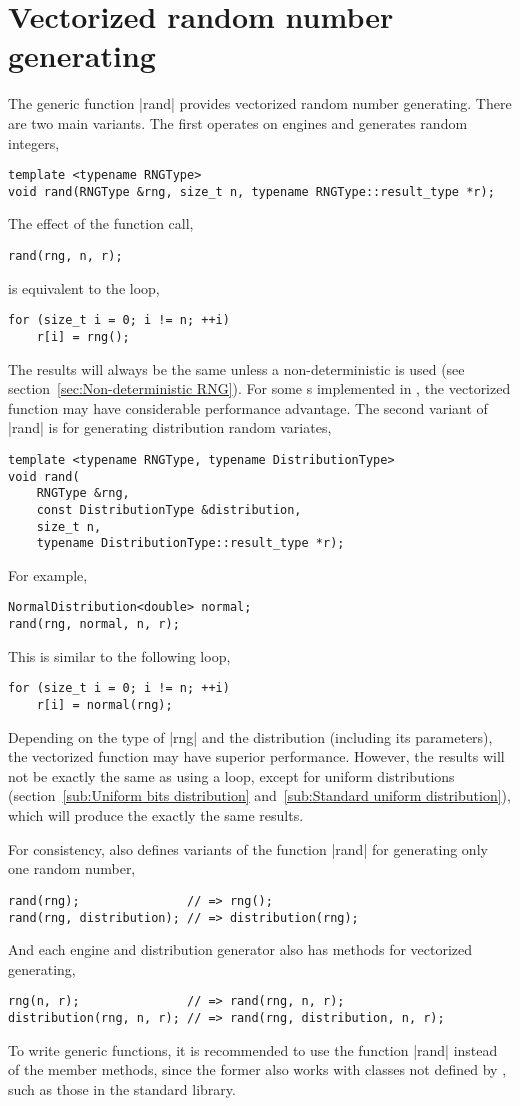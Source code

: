 \section{Vectorized random number generating}
\label{sec:Vectorized random number generating}

The generic function |rand| provides vectorized random number generating. There
are two main variants. The first operates on \rng engines and generates random
integers,
\begin{Verbatim}
template <typename RNGType>
void rand(RNGType &rng, size_t n, typename RNGType::result_type *r);
\end{Verbatim}
The effect of the function call,
\begin{Verbatim}
rand(rng, n, r);
\end{Verbatim}
is equivalent to the loop,
\begin{Verbatim}
for (size_t i = 0; i != n; ++i)
    r[i] = rng();
\end{Verbatim}
The results will always be the same unless a non-deterministic \rng is used
(see section~\ref{sec:Non-deterministic RNG}). For some \rng{}s implemented in
\mckl, the vectorized function may have considerable performance advantage. The
second variant of |rand| is for generating distribution random variates,
\begin{Verbatim}
template <typename RNGType, typename DistributionType>
void rand(
    RNGType &rng,
    const DistributionType &distribution,
    size_t n,
    typename DistributionType::result_type *r);
\end{Verbatim}
For example,
\begin{Verbatim}
NormalDistribution<double> normal;
rand(rng, normal, n, r);
\end{Verbatim}
This is similar to the following loop,
\begin{Verbatim}
for (size_t i = 0; i != n; ++i)
    r[i] = normal(rng);
\end{Verbatim}
Depending on the type of |rng| and the distribution (including its parameters),
the vectorized function may have superior performance. However, the results
will not be exactly the same as using a loop, except for uniform distributions
(section~\ref{sub:Uniform bits distribution} and~\ref{sub:Standard uniform
distribution}), which will produce the exactly the same results.

For consistency, \mckl also defines variants of the function |rand| for
generating only one random number,
\begin{Verbatim}
rand(rng);               // => rng();
rand(rng, distribution); // => distribution(rng);
\end{Verbatim}
And each \rng engine and distribution generator also has methods for vectorized
generating,
\begin{Verbatim}
rng(n, r);               // => rand(rng, n, r);
distribution(rng, n, r); // => rand(rng, distribution, n, r);
\end{Verbatim}
To write generic functions, it is recommended to use the function |rand|
instead of the member methods, since the former also works with classes not
defined by \mckl, such as those in the standard library.


